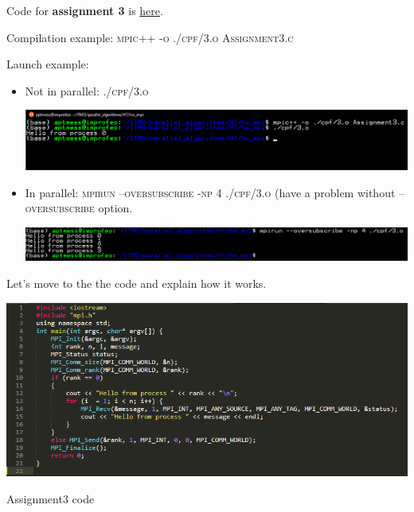 \documentclass[%
12pt, %
final, %
oneside, %
onecolumn, %
centertags]{article} %
\theoremstyle{plain}
\theoremstyle{definition}
\theoremstyle{remark}
\begin{document}
Code for \textbf{assignment 3} is \href{https:\//github.com/aptmess/parallel_algorithms/blob/master/HT/hw_mpi/Assignment3.c}{here}.

Compilation example: \textsc{mpic++ -o ./cpf/3.o Assignment3.c}

Launch example:

\begin{itemize}
	\item Not in parallel: \textsc{./cpf/3.o}

	\begin{center}
		\includegraphics[scale=0.5]{3.1.png}
	\end{center}


	\item In parallel: \textsc{mpirun --oversubscribe -np 4 ./cpf/3.o} (have a problem without \textsc{--oversubscribe} option.

	\begin{center}
		\includegraphics[scale=0.5]{3.2.png}
	\end{center}

\end{itemize}

Let's move to the the code and explain how it works.

\begin{center}
		\includegraphics[scale=0.75]{3.code.png}

		Assignment3 code
\end{center}
\end{document}
